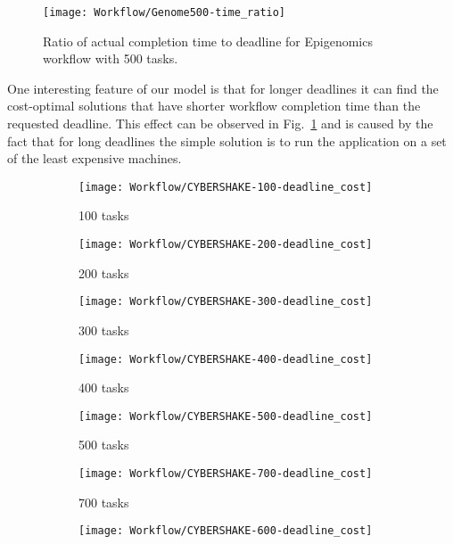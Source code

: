 {    \begin{figure}[tb]
       \centering \texttt{[image: Workflow/Genome500-time\_ratio]}
       \caption{Ratio of actual completion time to deadline for Epigenomics workflow with 500 tasks.
       \label{fig:workflow:genome-500-ratio}}
    \end{figure}
    
    One interesting feature of our model is that for longer deadlines it can find the cost-optimal solutions that have shorter workflow completion time than the requested deadline. This effect can be observed in Fig.~\ref{fig:workflow:genome-500-ratio} and is caused by the fact that for long deadlines the simple solution is to run the application on a set of the least expensive machines. 
    
    \begin{figure}[tb] 
       \centering       
       \begin{subfigure}[b]{0.45\textwidth}
         \texttt{[image: Workflow/CYBERSHAKE-100-deadline\_cost]}
         \caption{100 tasks}
       \end{subfigure}
       \begin{subfigure}[b]{0.45\textwidth}
         \texttt{[image: Workflow/CYBERSHAKE-200-deadline\_cost]}
         \caption{200 tasks}
       \end{subfigure}
       \begin{subfigure}[b]{0.45\textwidth}
         \texttt{[image: Workflow/CYBERSHAKE-300-deadline\_cost]}
         \caption{300 tasks}
       \end{subfigure}
       \begin{subfigure}[b]{0.45\textwidth}
         \texttt{[image: Workflow/CYBERSHAKE-400-deadline\_cost]}
         \caption{400 tasks}
       \end{subfigure}
       \begin{subfigure}[b]{0.45\textwidth}
         \texttt{[image: Workflow/CYBERSHAKE-500-deadline\_cost]}
         \caption{500 tasks}
       \end{subfigure}
       \begin{subfigure}[b]{0.45\textwidth}
         \texttt{[image: Workflow/CYBERSHAKE-700-deadline\_cost]}
         \caption{700 tasks}
       \end{subfigure}
       \begin{subfigure}[b]{0.45\textwidth}
         \texttt{[image: Workflow/CYBERSHAKE-600-deadline\_cost]}

\end{subfigure}
\end{figure}}
